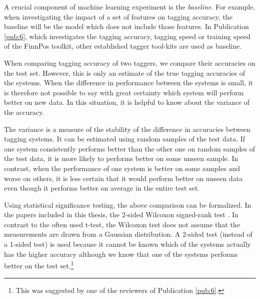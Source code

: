 A crucial component of machine learning experiment is the {\it
  baseline}. For example, when investigating the impact of a set of
features on tagging accuracy, the baseline will be the model which
does not include those features. In Publication \ref{pub:6}, which
investigates the tagging accuracy, tagging speed or training speed of
the FinnPos toolkit, other established tagger tool-kits are used as
baseline.

When comparing tagging accuracy of two taggers, we compare their
accuracies on the test set. However, this is only an estimate of the
true tagging accuracies of the systems. When the difference in
performance between the systems is small, it is therefore not possible
to say with great certainty which system will perform better on new
data. In this situation, it is helpful to know about the variance of
the accuracy. 

The variance is a measure of the stability of the difference in
accuracies between tagging systems. It can be estimated using random
samples of the test data. If one system consistently performs better
than the other one on random samples of the test data, it is more
likely to performs better on some unseen sample. In contrast, when the
performance of one system is better on some samples and worse on
others, it is less certain that it would perform better on unseen data
even though it performs better on average in the entire test set.

Using statistical significance testing, the above comparison can be
formalized. In the papers included in this thesis, the 2-sided
Wilcoxon signed-rank test \citep{Wilcoxon45}. In contrast to the often
used t-test, the Wilcoxon test does not assume that the measurements
are drawn from a Gaussian distribution. A 2-sided test (instead of a
1-sided test) is used because it cannot be known which of the systems
actually has the higher accuracy although we know that one of the
systems performs better on the test set.\footnote{This was suggested
  by one of the reviewers of Publication \ref{pub:6}.}

